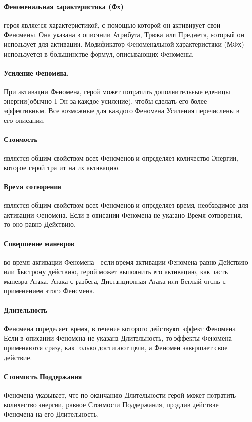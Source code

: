 \paragraph{Феноменальная характеристика (Фх)} героя является характеристикой, с помощью которой он активирует свои Феномены. Она указана в описании Атрибута, Трюка или Предмета, который он использует для активации. Модификатор Феноменальной характеристики (МФх) используется в большинстве формул, описывающих Феномены.
\paragraph{Усиление Феномена.} При активации Феномена, герой может потратить дополнительные еденицы энергии(обычно 1 Эн за каждое усиление), чтобы сделать его более эффективным. Все возможные для каждого Феномена Усиления перечислены в его описании.
\paragraph{Стоимость} является общим свойством всех Феноменов и определяет количество Энергии, которое герой тратит на их активацию.
\paragraph{Время сотворения} является общим свойством всех Феноменов и определяет время, необходимое для активации Феномена. Если в описании Феномена не указано Время сотворения, то оно равно Действию.
\paragraph{Совершение маневров} во время активации Феномена - если время активации Феномена равно Действию или Быстрому действию, герой может выполнить его активацию, как часть маневра Атака, Атака с разбега, Дистанционная Атака или Беглый огонь с применением этого Феномена.
\paragraph{Длительность} Феномена определяет время, в течение которого действуют эффект Феномена. Если в описании Феномена не указана Длительность, то эффекты Феномена применяются сразу, как только достигают цели, а Феномен завершает свое действие.
\paragraph{Стоимость Поддержания} Феномена указывает, что по оканчанию Длительности герой может потратить количество энергии, равное Стоимости Поддержания, продлив действие Феномена на его Длительность.
